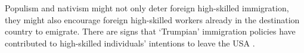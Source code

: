 \documentclass[12pt]{article}
\newcommand{\note}[1]{\footnote{\begin{doublespace}#1\end{doublespace}}}
\begin{document}
\par Populism and nativism might not only deter foreign high-skilled immigration, they might also encourage foreign high-skilled workers already in the destination country to emigrate. There are signs that `Trumpian' immigration policies have contributed to high-skilled individuals' intentions to leave the USA \citep{Wadhwa2009}. 

 



\end{document}

